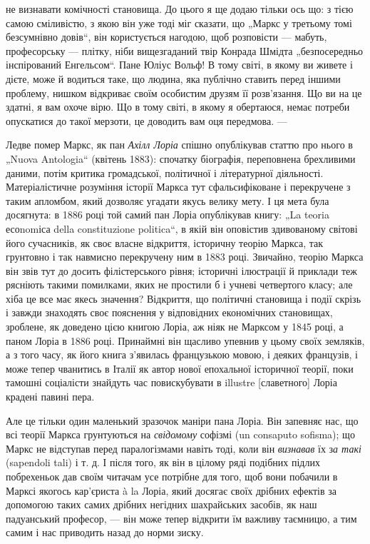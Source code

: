 \parcont{}  %
не визнавати комічності становища. До цього я ще додаю тільки
ось що: з тією самою сміливістю, з якою він уже тоді міг сказати,
що „Маркс у третьому томі безсумнівно довів“, він користується
нагодою, щоб розповісти — мабуть, професорську —
плітку, ніби вищезгаданий твір Конрада Шмідта „безпосередньо
інспірований Енгельсом“. Пане Юліус Вольф! В тому світі, в якому
ви живете і дієте, може й водиться таке, що людина, яка публічно
ставить перед іншими проблему, нишком відкриває своїм
особистим друзям її розв’язання. Що ви на це здатні, я вам охоче
вірю. Що в тому світі, в якому я обертаюся, немає потреби
опускатися до такої мерзоти, це доводить вам оця передмова. —

Ледве помер Маркс, як пан \emph{Ахілл Лоріа} спішно опублікував
статтю про нього в „Nuova Antologia“ (квітень 1883): спочатку
біографія, переповнена брехливими даними, потім критика
громадської, політичної і літературної діяльності. Матеріалістичне
розуміння історії Маркса тут сфальсифіковане і перекручене
з таким апломбом, який дозволяє угадати якусь велику
мету. І ця мета була досягнута: в 1886 році той самий пан
Лоріа опублікував книгу: „La teoria есоnomіса della constituzione
politica“, в якій він оповістив здивованому світові його сучасників,
як своє власне відкриття, історичну теорію Маркса, так
грунтовно і так навмисно перекручену ним в 1883 році. Звичайно,
теорію Маркса він звів тут до досить філістерського
рівня; історичні ілюстрації й приклади теж рясніють такими помилками,
яких не простили б і учневі четвертого класу; але
хіба це все має якесь значення? Відкриття, що політичні становища
і події скрізь і завжди знаходять своє пояснення у відповідних
економічних становищах, зроблене, як доведено цією книгою
Лоріа, аж ніяк не Марксом у 1845 році, а паном Лоріа
в 1886 році. Принаймні він щасливо упевнив у цьому своїх земляків,
а з того часу, як його книга з’явилась французькою мовою,
і деяких французів, і може тепер чванитись в Італії як
автор нової епохальної історичної теорії, поки тамошні соціалісти
знайдуть час повискубувати в illustre [славетного] Лоріа
крадені павині пера.

Але це тільки один маленький зразочок маніри пана Лоріа.
Він запевняє нас, що всі теорії Маркса грунтуються на \emph{свідомому}
софізмі (un consaputo sofisma); що Маркс не відступав
перед паралогізмами навіть тоді, коли він \emph{визнавав} їх з\emph{а такі}
(sapendoli tali) і т. д. І після того, як він в цілому ряді подібних
підлих побрехеньок дав своїм читачам усе потрібне для
того, щоб вони побачили в Марксі якогось кар’єриста à la Лоріа,
який досягає своїх дрібних ефектів за допомогою таких самих
дрібних негідних шахрайських засобів, як наш падуанський професор,
— він може тепер відкрити їм важливу таємницю, а тим
самим і нас приводить назад до норми зиску.

